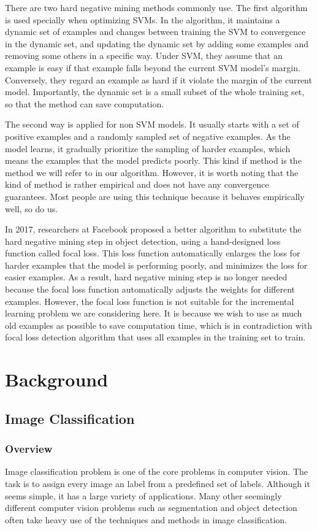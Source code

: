 There are two hard negative mining methods commonly use. The first algorithm is used specially when optimizing SVMs. In the algorithm, it maintains a dynamic set of examples and changes between training the SVM to convergence in the dynamic set, and updating the dynamic set by adding some examples and removing some others in a specific way\cite{felzenszwalb2010object}. Under SVM, they assume that an example is easy if that example falls beyond the current SVM model's margin. Conversely, they regard an example as hard if it violate the margin of the current model. Importantly, the dynamic set is a small subset of the whole training set, so that the method can save computation.

The second way is applied for non SVM models. It usually starts with a set of positive examples and a randomly sampled set of negative examples. As the model learns, it gradually prioritize the sampling of harder examples, which means the examples that the model predicts poorly. This kind if method is the method we will refer to in our algorithm. However, it is worth noting that the kind of method is rather empirical and does not have any convergence guarantees. Most people are using this technique because it behaves empirically well, so do us.

In 2017, researchers at Facebook proposed a better algorithm to substitute the hard negative mining step in object detection, using a hand-designed loss function called focal loss\cite{lin2017focal}. This loss function automatically enlarges the loss for harder examples that the model is performing poorly, and minimizes the loss for easier examples. As a result, hard negative mining step is no longer needed because the focal loss function automatically adjusts the weights for different examples. However, the focal loss function is not suitable for the incremental learning problem we are considering here. It is because we wish to use as much old examples as possible to save computation time, which is in contradiction with focal loss detection algorithm that uses all examples in the training set to train.

\chapter{Background}

\section{Image Classification}
\subsection{Overview}
Image classification problem is one of the core problems in computer vision. The task is to assign every image an label from a predefined set of labels. Although it seems simple, it has a large variety of applications. Many other seemingly different computer vision problems such as segmentation and object detection often take heavy use of the techniques and methods in image classification. 

